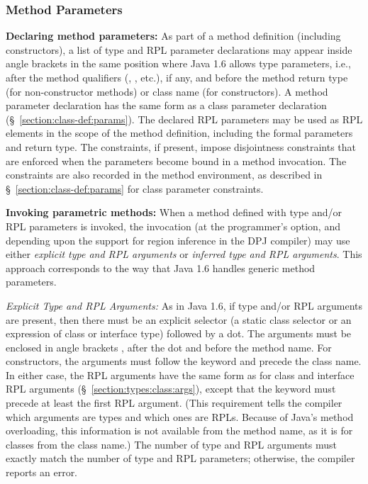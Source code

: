 \subsubsection{Method Parameters}
\label{section:class-def:params:method}

\noindent
\textbf{Declaring method parameters:} As part of a method definition
(including constructors), a list of type and RPL parameter
declarations may appear inside angle brackets  in the same
position where Java 1.6 allows type parameters, i.e., after the method
qualifiers (, , etc.), if any, and before the
method return type (for non-constructor methods) or class name (for
constructors).  A method parameter declaration has the same form as a
class parameter declaration (\S~\ref{section:class-def:params}).  The
declared RPL parameters may be used as RPL elements in the scope of
the method definition, including the formal parameters and return
type.  The constraints, if present, impose disjointness constraints
that are enforced when the parameters become bound in a method
invocation.  The constraints are also recorded in the method
environment, as described in \S~\ref{section:class-def:params} for
class parameter constraints.

\noindent
\textbf{Invoking parametric methods:} When a method defined with type
and/or RPL parameters is invoked, the invocation (at the programmer's
option, and depending upon the support for region inference in the DPJ
compiler) may use either \emph{explicit type and RPL arguments} or
\emph{inferred type and RPL arguments}.  This approach corresponds to
the way that Java 1.6 handles generic method parameters.

\noindent
\textit{Explicit Type and RPL Arguments:} As in Java 1.6, if type
and/or RPL arguments are present, then there must be an explicit
selector (a static class selector or an expression of class or
interface type) followed by a dot.  The arguments must be enclosed in
angle brackets , after the dot and before the method name.
For constructors, the arguments must follow the keyword  and
precede the class name.  In either case, the RPL arguments have the
same form as for class and interface RPL arguments
(\S~\ref{section:types:class:args}), except that the keyword
 must precede at least the first RPL argument.  (This
requirement tells the compiler which arguments are types and which
ones are RPLs.  Because of Java's method overloading, this information
is not available from the method name, as it is for classes from the
class name.)  The number of type and RPL arguments must exactly match
the number of type and RPL parameters; otherwise, the compiler reports
an error.

